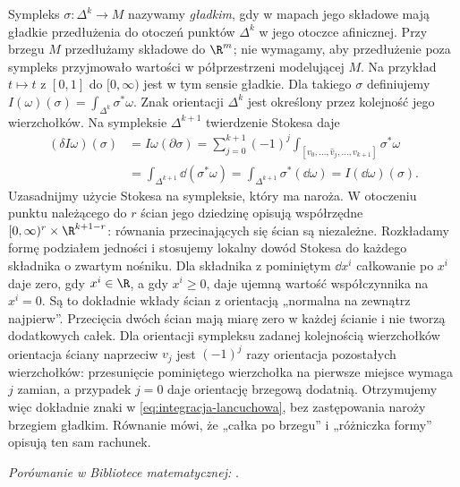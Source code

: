 Sympleks $\sigma:\Delta^k\to M$ nazywamy \emph{gładkim},
gdy w mapach jego składowe mają gładkie przedłużenia
do otoczeń punktów $\Delta^k$ w jego otoczce afinicznej.
Przy brzegu $M$ przedłużamy składowe do $\R^m$;
nie wymagamy, aby przedłużenie poza sympleks przyjmowało
wartości w półprzestrzeni modelującej $M$.
Na przykład $t\mapsto t$ z $[0,1]$ do $[0,\infty)$
jest w tym sensie gładkie. Dla takiego $\sigma$ definiujemy
$I(\omega)(\sigma)=\int_{\Delta^k}\sigma^*\omega$.
Znak orientacji $\Delta^k$ jest określony przez
kolejność jego wierzchołków. Na sympleksie
$\Delta^{k+1}$ twierdzenie Stokesa daje
\begin{equation}\label{eq:integracja-lancuchowa}
 \begin{aligned}
 (\delta I\omega)(\sigma)
 &= I\omega(\partial\sigma)
  =\sum_{j=0}^{k+1}(-1)^j
      \int_{[v_0,\ldots,\widehat v_j,\ldots,v_{k+1}]}
          \sigma^*\omega \\
 &=\int_{\Delta^{k+1}}\dd(\sigma^*\omega)
  =\int_{\Delta^{k+1}}\sigma^*(\dd\omega)
  =I(\dd\omega)(\sigma).
 \end{aligned}
\end{equation}
Uzasadnijmy użycie Stokesa na sympleksie, który ma naroża.
W otoczeniu punktu należącego do $r$ ścian jego dziedzinę
opisują współrzędne
$[0,\infty)^r\times\R^{k+1-r}$: równania przecinających
się ścian są niezależne. Rozkładamy formę podziałem
jedności i stosujemy lokalny dowód Stokesa do każdego
składnika o zwartym nośniku. Dla składnika z pominiętym
$\dd x^i$ całkowanie po $x^i$ daje zero, gdy $x^i\in\R$,
a gdy $x^i\geq0$, daje ujemną wartość współczynnika
na $x^i=0$. Są to dokładnie wkłady ścian z orientacją
„normalna na zewnątrz najpierw”. Przecięcia dwóch ścian
mają miarę zero w każdej ścianie i nie tworzą dodatkowych
całek. Dla orientacji sympleksu zadanej kolejnością
wierzchołków orientacja ściany naprzeciw $v_j$ jest
$(-1)^j$ razy orientacja pozostałych wierzchołków:
przesunięcie pominiętego wierzchołka na pierwsze miejsce
wymaga $j$ zamian, a przypadek $j=0$ daje orientację
brzegową dodatnią. Otrzymujemy więc dokładnie znaki
w \eqref{eq:integracja-lancuchowa}, bez zastępowania
naroży brzegiem gładkim.
Równanie mówi, że „całka po brzegu” i „różniczka
formy” opisują ten sam rachunek.

\noindent\emph{Porównanie w Bibliotece matematycznej:} .

